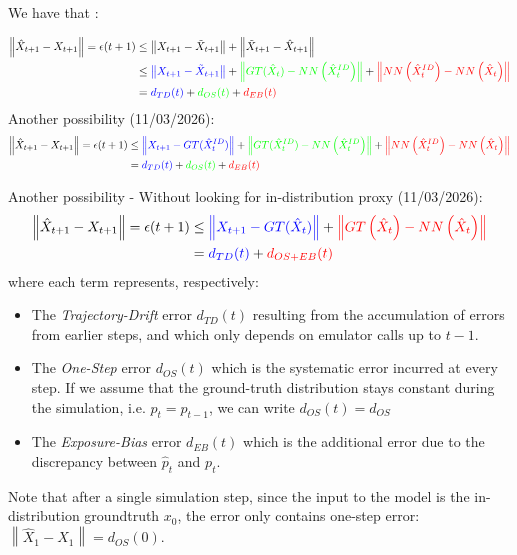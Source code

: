 \documentclass{article}
\newcommand{\norm}[1]{\left\lVert#1\right\rVert}
\begin{document}
We have that :

\begin{align*}
    \norm{\hat{X}_{t+1} - X_{t+1}} = \epsilon(t+1) &\leq \norm{X_{t+1} - \tilde{X}_{t+1}} + \norm{\tilde{X}_{t+1} - \hat{X}_{t+1}} \\ 
    &\leq \textcolor{blue}{\norm{X_{t+1} - {\tilde{X}_{t+1}}}} + \textcolor{green}{\norm{GT(\hat{X}_{t}) - NN\left(\hat{X}_t^{ID}\right)}} + \textcolor{red}{\norm{NN\left(\hat{X}_t^{ID}\right) - NN\left(\hat{X}_t\right)}} \\
    &= \textcolor{blue}{d_{TD}(t)} + \textcolor{green}{d_{OS}(t)} + \textcolor{red}{d_{EB}(t)}
\end{align*}
Another possibility (11/03/2026): 
\begin{align*}
    \norm{\hat{X}_{t+1} - X_{t+1}} = \epsilon(t+1)
    &\leq \textcolor{blue}{\norm{X_{t+1} - GT(\hat{X}_{t}^{ID})}} + \textcolor{green}{\norm{GT(\hat{X}_{t}^{ID}) - NN\left(\hat{X}_t^{ID}\right)}} + \textcolor{red}{\norm{NN\left(\hat{X}_t^{ID}\right) - NN\left(\hat{X}_t\right)}} \\
    &= \textcolor{blue}{d_{TD}(t)} + \textcolor{green}{d_{OS}(t)} + \textcolor{red}{d_{EB}(t)}
\end{align*}

Another possibility - Without looking for in-distribution proxy (11/03/2026): 
\begin{align*}
    \norm{\hat{X}_{t+1} - X_{t+1}} = \epsilon(t+1)
    &\leq \textcolor{blue}{\norm{X_{t+1} - GT(\hat{X}_t)}} + \textcolor{red}{\norm{GT\left(\hat{X}_t\right) - NN\left(\hat{X}_t\right)}} \\
    &= \textcolor{blue}{d_{TD}(t)} + \textcolor{red}{d_{OS+EB}(t)}
\end{align*}
where each term represents, respectively:
\begin{itemize}
    \item The \textit{Trajectory-Drift} error $d_{TD}(t)$ resulting from the accumulation of errors from earlier steps, and which only depends on emulator calls up to $t-1$.
    \item The \textit{One-Step} error $d_{OS}(t)$ which is the systematic error incurred at every step. If we assume that the ground-truth distribution stays constant during the simulation, i.e. $p_t = p_{t-1}$, we can write $d_{OS}(t) = d_{OS}$
    \item The \textit{Exposure-Bias} error $d_{EB}(t)$ which is the additional error due to the discrepancy between $\hat{p}_t$ and $p_t$.
\end{itemize}
Note that after a single simulation step, since the input to the model is the in-distribution groundtruth $x_0$, the error only contains one-step error: $\norm{\hat{X}_1 - X_1} = d_{OS}(0)$.
\end{document}
